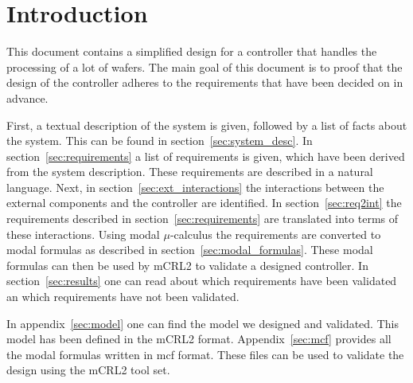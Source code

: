 \section{Introduction}
This document contains a simplified design for a controller that handles the processing of a lot of wafers.
The main goal of this document is to proof that the design of the controller adheres to the requirements that have been decided on in advance.

First, a textual description of the system is given, followed by a list of facts about the system. This can be found in section~\ref{sec:system_desc}.
In section~\ref{sec:requirements} a list of requirements is given, which have been derived from the system description. These requirements are described in a natural language.
Next, in section~\ref{sec:ext_interactions} the interactions between the external components and the controller are identified.
In section~\ref{sec:req2int} the requirements described in section~\ref{sec:requirements} are translated into terms of these interactions.
Using modal $\mu$-calculus the requirements are converted to modal formulas as described in section~\ref{sec:modal_formulas}.
These modal formulas can then be used by mCRL2 to validate a designed controller.
In section~\ref{sec:results} one can read about which requirements have been validated an which requirements have not been validated.

In appendix~\ref{sec:model} one can find the model we designed and validated.
This model has been defined in the mCRL2 format.
Appendix~\ref{sec:mcf} provides all the modal formulas written in mcf format.
These files can be used to validate the design using the mCRL2 tool set.